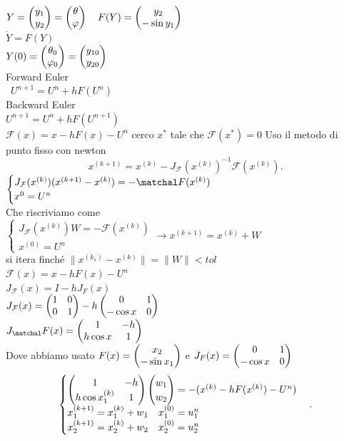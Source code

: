 \documentclass[12px]{article}
\begin{document}
 $Y = \begin{pmatrix}y_1\\y_2\end{pmatrix}=\begin{pmatrix}\theta\\\varphi\end{pmatrix} \ \ \ F(Y) = \begin{pmatrix}y_2\\-\sin y_1\end{pmatrix}$\\
 $\dot Y = F(Y)$\\
 $Y(0) = \begin{pmatrix}\theta_0\\ \varphi_0\end{pmatrix} = \begin{pmatrix}y_{10}\\y_{20}\end{pmatrix}$ \\
 Forward Euler\\\
 $U^{n+1}=U^n + hF(U^n)$\\
 Backward Euler\\
 $U^{n+1} = U^n+ hF(U^{n+1})$\\
 $\mathcal F(x) = x - hF(x) - U^n$ cerco  $x^*$ tale che  $\mathcal F(x^*) = 0$ Uso il metodo di punto fisso con newton\\
 \[
	 x^{(k+1)} = x^{(k)} - J_{\mathcal F}(x^{(k)})^{-1}\mathcal F(x^{(k)})
 .\] 
 $
 \begin{cases}
	 J_{\mathcal F} (x^{(k)})(x^{(k+1)}-x^{(k)}) = -\matchal F(x^{(k)})\\
	 x^{0} = U^n
 \end{cases}
 $\\
 Che riscriviamo come\\
 $
 \begin{cases}
	 J_{\mathcal F}(x^{(k)})W = - \mathcal F(x^{(k)})\\
 x^{(0)} = U^n
\end{cases} \rightarrow x^{(k+1)} = x^{(k)} + W$\\
si itera finché $\|x^{(k_1)}- x^{(k)}\| = \|W\|<tol$\\
 $\mathcal F(x) = x - hF(x) - U^n$\\
 $J_{\mathcal F}(x) = I-h J_F(x)$ \\
 $J_\mathcal F(x) = \begin{pmatrix}1 & 0 \\ 0 & 1\end{pmatrix}- h\begin{pmatrix}0 & 1\\-\cos x & 0\end{pmatrix}$\\
 $J_\matchal F(x) = \matrice{1 & -h\\h\cos x & 1}$\\
 Dove abbiamo usato  $F(x) = \begin{pmatrix}x_2\\-\sin x_1\end{pmatrix}$ e $J_F(x) = \begin{pmatrix}0 & 1\\-\cos x& 0\end{pmatrix}$
  \[
 \begin{cases}
	 \begin{pmatrix}1 & - h\\
 h\cos x_1^{(k)} & 1\end{pmatrix}\begin{pmatrix}w_1\\w_2\end{pmatrix} = -(x^{(k)} - hF(x^{(k)}) - U^n)\\
	x_1^{(k+1)} = x_1^{(k)} + w_1 \ \ \ x_1^{(0)} = u_1^n\\
	x_2^{(k+1)} = x_2^{(k)} + w_2 \ \ \ x_2^{(0)} = u_2^n
 \end{cases}
 .\] 
\end{document}
